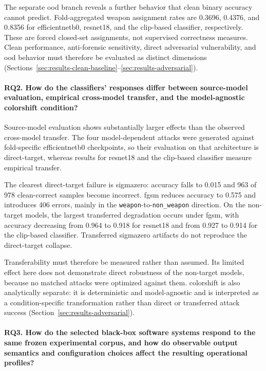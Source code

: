The separate \gls{ood} branch reveals a further behavior that clean binary
accuracy cannot predict. Fold-aggregated weapon assignment rates are 0.3696,
0.4376, and 0.8356 for \gls{efficientnetb0}, \gls{resnet18}, and the
\gls{clip}-based classifier, respectively. These are forced closed-set assignments,
not supervised correctness measures. Clean performance, anti-forensic
sensitivity, direct adversarial vulnerability, and \gls{ood} behavior must
therefore be evaluated as distinct dimensions
(Sections~\ref{sec:results-clean-baseline}--\ref{sec:results-adversarial}).

\paragraph{\textbf{RQ2. How do the classifiers' responses differ between
source-model evaluation, empirical cross-model transfer, and the
model-agnostic \gls{colorshift} condition?}}

Source-model evaluation shows substantially larger effects than the observed
cross-model transfer. The four model-dependent attacks were generated
against fold-specific \gls{efficientnetb0} checkpoints, so their evaluation on
that architecture is direct-target, whereas results for \gls{resnet18} and the
\gls{clip}-based classifier measure empirical transfer.

The clearest direct-target failure is \gls{sigmazero}: accuracy falls to 0.015
and 963 of 978 clean-correct samples become incorrect. \gls{fgsm} reduces
accuracy to 0.575 and introduces 406 errors, mainly in the
\texttt{weapon}-to-\texttt{non\_weapon} direction. On the non-target models,
the largest transferred degradation occurs under \gls{fgsm}, with accuracy
decreasing from 0.964 to 0.918 for \gls{resnet18} and from 0.927 to 0.914 for
the \gls{clip}-based classifier. Transferred \gls{sigmazero} artifacts do not
reproduce the direct-target collapse.

Transferability must therefore be measured rather than assumed. Its limited
effect here does not demonstrate direct robustness of the non-target models,
because no matched attacks were optimized against them. \gls{colorshift} is
also analytically separate: it is deterministic and model-agnostic and is
interpreted as a condition-specific transformation rather than direct or
transferred attack success (Section~\ref{sec:results-adversarial}).

\paragraph{\textbf{RQ3. How do the selected black-box software systems respond
to the same frozen experimental corpus, and how do observable output semantics
and configuration choices affect the resulting operational profiles?}}

